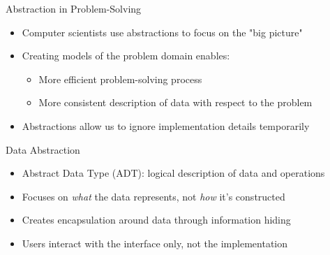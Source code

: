 \documentclass{beamer}
\begin{document}
\begin{frame}{Abstraction in Problem-Solving}
    \begin{itemize}
        \item Computer scientists use abstractions to focus on the "big picture"
        \item Creating models of the problem domain enables:
        \begin{itemize}
            \item More efficient problem-solving process
            \item More consistent description of data with respect to the problem
        \end{itemize}
        \item Abstractions allow us to ignore implementation details temporarily
    \end{itemize}
\end{frame}

\begin{frame}{Data Abstraction}
    \begin{itemize}
        \item Abstract Data Type (ADT): logical description of data and operations
        \item Focuses on \textit{what} the data represents, not \textit{how} it's constructed
        \item Creates encapsulation around data through information hiding
        \item Users interact with the interface only, not the implementation
    \end{itemize}
\end{frame}
\end{document}
